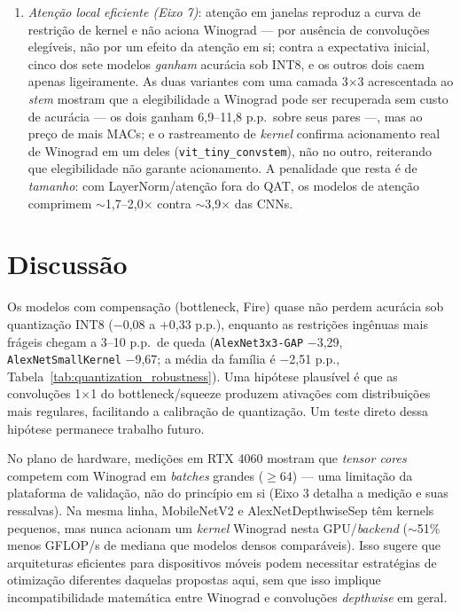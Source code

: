\documentclass[conference]{IEEEtran}
\begin{document}
\begin{enumerate}
\item \emph{Atenção local eficiente (Eixo 7)}: atenção em janelas reproduz a curva de restrição de
kernel e não aciona Winograd — por ausência de convoluções elegíveis, não por um efeito da atenção
em si; contra a expectativa inicial, cinco dos sete modelos \emph{ganham} acurácia sob INT8, e os
outros dois caem apenas ligeiramente. As duas variantes com uma camada 3$\times$3 acrescentada ao
\textit{stem} mostram que a elegibilidade a Winograd pode ser recuperada sem custo de
acurácia --- os dois ganham 6,9--11,8 p.p.\ sobre seus pares ---, mas ao preço de mais MACs; e o
rastreamento de \textit{kernel} confirma acionamento real de Winograd em um deles
(\texttt{vit\_tiny\_convstem}), não no outro, reiterando que elegibilidade não garante acionamento.
A penalidade que resta é de
\emph{tamanho}: com LayerNorm/atenção fora do QAT, os modelos de atenção comprimem
$\sim$1,7--2,0$\times$ contra $\sim$3,9$\times$ das CNNs.

\end{enumerate}

\section{Discussão}
\label{sec:discussao}

Os modelos com compensação (bottleneck, Fire) quase não perdem acurácia sob quantização INT8
($-$0,08 a +0,33 p.p.), enquanto as restrições ingênuas mais frágeis chegam a 3--10 p.p.\ de
queda (\texttt{AlexNet3x3-GAP} $-$3,29, \texttt{AlexNetSmallKernel} $-$9,67; a média da família é
$-$2,51 p.p., Tabela~\ref{tab:quantization_robustness}). Uma hipótese
plausível é que as convoluções 1$\times$1 do bottleneck/squeeze produzem ativações com
distribuições mais regulares, facilitando a calibração de quantização. Um teste direto dessa
hipótese permanece trabalho futuro.

No plano de hardware, medições em RTX 4060 mostram que \textit{tensor cores} competem com Winograd
em \textit{batches} grandes ($\geq 64$) — uma limitação da plataforma de validação, não do princípio
em si (Eixo 3 detalha a medição e suas ressalvas). Na mesma linha, MobileNetV2 e AlexNetDepthwiseSep
têm kernels pequenos, mas nunca acionam um \textit{kernel} Winograd nesta GPU/\textit{backend}
($\sim$51\% menos GFLOP/s de mediana que modelos densos comparáveis). Isso sugere que
arquiteturas eficientes para dispositivos móveis podem necessitar estratégias de otimização
diferentes daquelas propostas aqui, sem que isso implique incompatibilidade matemática entre
Winograd e convoluções \textit{depthwise} em geral.
\end{document}
